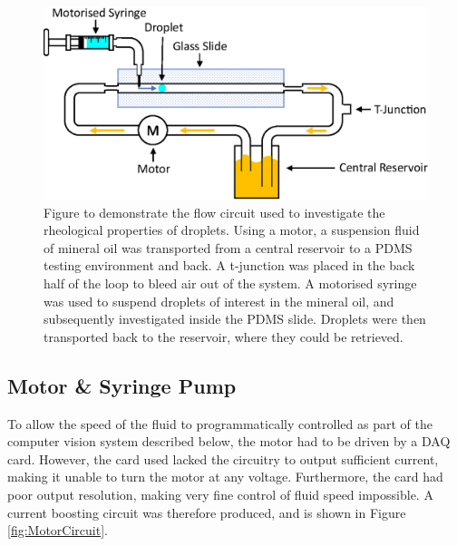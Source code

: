 \documentclass{physics_article_B}
\begin{document}
            \begin{figure}[H]
                \centering
                    \hspace*{2.0cm}\includegraphics[scale=0.8]{Figures/Fluid.eps}
                    \caption{Figure to demonstrate the flow circuit used to investigate the rheological properties of droplets. Using a motor, a suspension fluid of mineral oil was transported from a central reservoir to a PDMS testing environment and back. A t-junction was placed in the back half of the loop to bleed air out of the system. A motorised syringe was used to suspend droplets of interest in the mineral oil, and subsequently investigated inside the PDMS slide. Droplets were then transported back to the reservoir, where they could be retrieved.} 	
                \label{fig:basic}
            \end{figure} 

    \subsection{Motor \& Syringe Pump\label{sect:method:motor}}

        To allow the speed of the fluid to programmatically controlled as part of the computer vision system described below, the motor had to be driven by a DAQ card. However, the card used lacked the circuitry to output sufficient current, making it unable to turn the motor at any voltage. Furthermore, the card had poor output resolution, making very fine control of fluid speed impossible. A current boosting circuit was therefore produced, and is shown in Figure \ref{fig:MotorCircuit}.  
        
\end{document}

